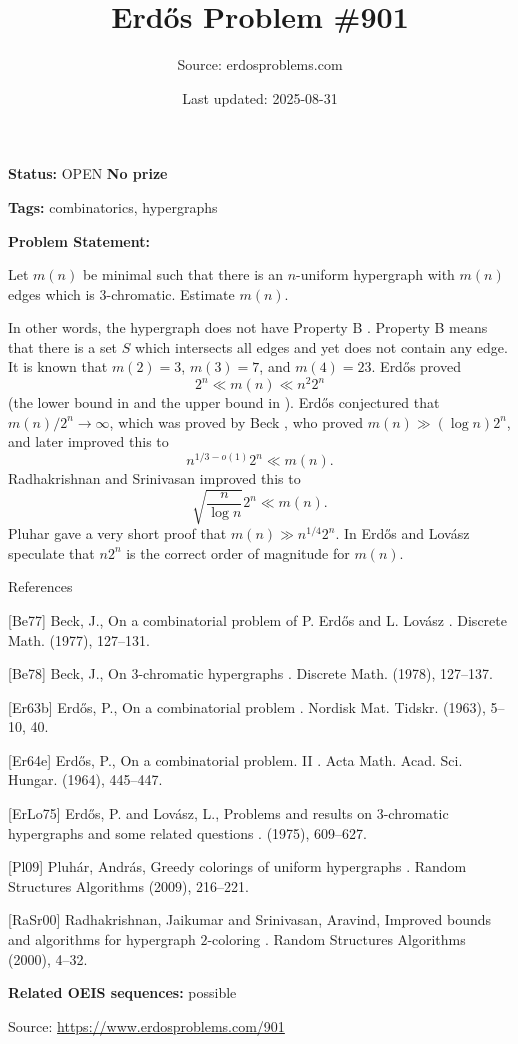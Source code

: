 \documentclass{article}
\title{Erd\H{o}s Problem \#901}
\date{Last updated: 2025-08-31}
\author{Source: erdosproblems.com}
\begin{document}
\maketitle

\noindent\textbf{Status:} OPEN \quad \textbf{No prize}

\noindent\textbf{Tags:} combinatorics, hypergraphs

\medskip

\noindent\textbf{Problem Statement:}

Let $m(n)$ be minimal such that there is an $n$-uniform hypergraph with $m(n)$ edges which is $3$-chromatic. Estimate $m(n)$.




In other words, the hypergraph does not have Property B . Property B means that there is a set $S$ which intersects all edges and yet does not contain any edge. It is known that $m(2)=3$, $m(3)=7$, and $m(4)=23$. Erd\H{o}s proved\[2^n \ll m(n) \ll n^2 2^n\](the lower bound in \cite{Er63b} and the upper bound in \cite{Er64e}). Erd\H{o}s conjectured that $m(n)/2^n\to \infty$, which was proved by Beck \cite{Be77}, who proved $m(n)\gg (\log n)2^n$, and later \cite{Be78} improved this to\[n^{1/3-o(1)}2^n \ll m(n).\]Radhakrishnan and Srinivasan \cite{RaSr00} improved this to\[\sqrt{\frac{n}{\log n}}2^n \ll m(n).\]Pluhar \cite{Pl09} gave a very short proof that $m(n) \gg n^{1/4}2^n$. In \cite{ErLo75} Erd\H{o}s and Lov\'{a}sz speculate that $n2^n$ is the correct order of magnitude for $m(n)$.




References

[Be77] Beck, J., On a combinatorial problem of {P}. {E}rd\H{o}s and {L}. {L}ov\'{a}sz . Discrete Math. (1977), 127--131.

[Be78] Beck, J., On {$3$}-chromatic hypergraphs . Discrete Math. (1978), 127--137.

[Er63b] Erd\H{o}s, P., On a combinatorial problem . Nordisk Mat. Tidskr. (1963), 5--10, 40.

[Er64e] Erd\H{o}s, P., On a combinatorial problem. {II} . Acta Math. Acad. Sci. Hungar. (1964), 445--447.

[ErLo75] Erd\H{o}s, P. and Lov\'{a}sz, L., Problems and results on {$3$}-chromatic hypergraphs and some related questions . (1975), 609--627.

[Pl09] Pluh\'{a}r, Andr\'{a}s, Greedy colorings of uniform hypergraphs . Random Structures Algorithms (2009), 216--221.

[RaSr00] Radhakrishnan, Jaikumar and Srinivasan, Aravind, Improved bounds and algorithms for hypergraph {$2$}-coloring . Random Structures Algorithms (2000), 4--32.

\noindent\textbf{Related OEIS sequences:} possible


\bigskip
\noindent\small{Source: \url{https://www.erdosproblems.com/901}}
\end{document}
